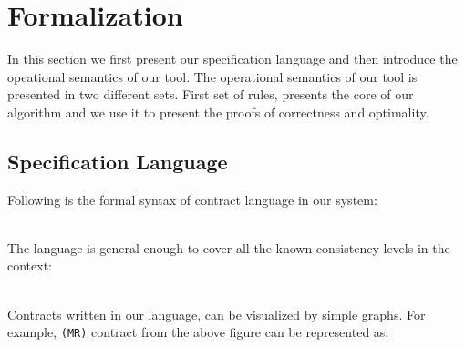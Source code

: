 \section{Formalization}
In this section we first present our specification language and then
introduce the opeational semantics of our tool. The operational semantics of our tool is presented in two different sets. First set of rules, presents the core of our algorithm and we use it to present the proofs of correctness and optimality. 
\subsection{Specification Language}
Following is the formal syntax of contract language in our system:

\\ The language is general enough to cover all  the known consistency
levels in the context:

\\ Contracts written in our language, can be visualized by simple graphs. For example, \texttt{(MR)} contract from the above figure can be represented as:



\newpage
